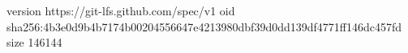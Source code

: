 version https://git-lfs.github.com/spec/v1
oid sha256:4b3e0d9b4b7174b00204556647e4213980dbf39d0dd139df4771ff146dc457fd
size 146144
